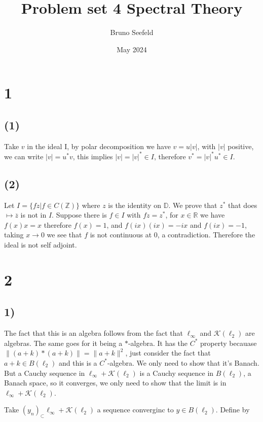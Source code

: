 \documentclass{article}
\title{Problem set 4 Spectral Theory}
\author{Bruno Seefeld}
\date{May 2024}
\begin{document}
\maketitle





\section*{1}
\subsection*{(1)}
Take $v$ in the ideal I, by polar decomposition we have $v=u|v|$, with $|v|$ positive, we can write $|v|=u^* v$, this implies $|v|=|v|^\ast \in I$, therefore 
$v^\ast=|v|^\ast u^*\in I$.

\subsection*{(2)}

Let $I=\{fz|f\in C(\mathbb{Z})\}$ where $z$ is the identity on $\mathbb{D}$. We prove that $z^\ast$ that does $\mapsto \overline{z}$ is not in $I$. Suppose 
there is $f\in I$ with $fz=z^\ast$, for $x\in \mathbb{R}$ we have $f(x)x=x$ therefore $f(x)=1$, and $f(ix)(ix)=-ix$ and $f(ix)=-1$, taking $x\to 0$ we see that $f$ is 
not continuous at $0$, a contradiction. Therefore the ideal is not self adjoint.  


\section*{2}
\subsection*{1)}
The fact that this is an algebra follows from the fact that $\ell_\infty$ and
$\mathcal{K}(\ell_2)$ are algebras. The same goes for it being a $*$-algebra.
It has the $C^*$ property becauase $\|(a+k)*(a+k)\|=\|a+k\|^2$, just consider
the fact that $a+k\in B(\ell_2)$ and this is a $C^\ast$-algebra.
We only need to show that it's Banach. But a Cauchy sequence in $\ell_\infty+
\mathcal{K}(\ell_2)$ is a Cauchy sequence in $B(\ell_2)$, a Banach space, so 
it converges, we only need to show that the limit is in $\ell_\infty+
\mathcal{K}(\ell_2)$.


Take $(y_n)_\subset \ell_\infty + \mathcal{K}(\ell_2)$ a sequence converginc
to $y\in B(\ell_2)$. Define 
by
\end{document}
